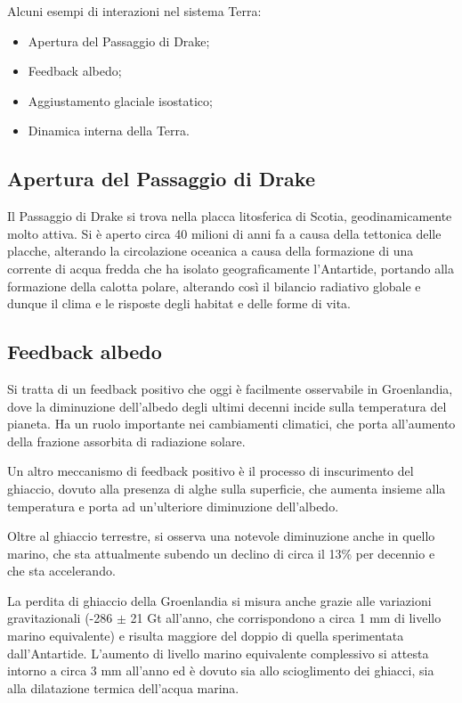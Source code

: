 \documentclass[a4paper,12pt]{book}
\begin{document}
\noindent
Alcuni esempi di interazioni nel sistema Terra:

\begin{itemize}
    \item Apertura del Passaggio di Drake;
    \item Feedback albedo;
    \item Aggiustamento glaciale isostatico;
    \item Dinamica interna della Terra.
\end{itemize}

\subsection{\textcolor{colore2}{Apertura del Passaggio di Drake}}

Il Passaggio di Drake si trova nella placca litosferica di Scotia, geodinamicamente molto attiva.
Si è aperto circa 40 milioni di anni fa a causa della tettonica delle placche, alterando la circolazione oceanica a causa della formazione di una corrente di acqua fredda che ha isolato geograficamente l'Antartide, portando alla formazione della calotta polare, alterando così il bilancio radiativo globale e dunque il clima e le risposte degli habitat e delle forme di vita.

\subsection{\textcolor{colore2}{Feedback albedo}}

Si tratta di un feedback positivo che oggi è facilmente osservabile in Groenlandia, dove la diminuzione dell'albedo degli ultimi decenni incide sulla temperatura del pianeta.
Ha un ruolo importante nei cambiamenti climatici, che porta all'aumento della frazione assorbita di radiazione solare.

Un altro meccanismo di feedback positivo è il processo di inscurimento del ghiaccio, dovuto alla presenza di alghe sulla superficie, che aumenta insieme alla temperatura e porta ad un'ulteriore diminuzione dell'albedo.

Oltre al ghiaccio terrestre, si osserva una notevole diminuzione anche in quello marino, che sta attualmente subendo un declino di circa il 13\% per decennio e che sta accelerando.

La perdita di ghiaccio della Groenlandia si misura anche grazie alle variazioni gravitazionali (-286 $\pm$ 21 Gt all'anno, che corrispondono a circa 1 mm di livello marino equivalente) e risulta maggiore del doppio di quella sperimentata dall'Antartide.
L'aumento di livello marino equivalente complessivo si attesta intorno a circa 3 mm all'anno ed è dovuto sia allo scioglimento dei ghiacci, sia alla dilatazione termica dell'acqua marina.
\end{document}
